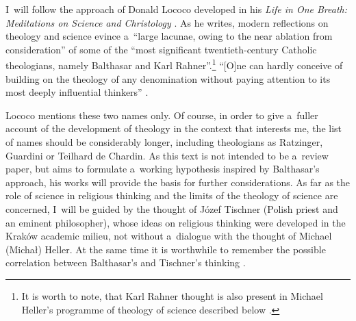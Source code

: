 I~will follow the approach of Donald Lococo developed in his \textit{Life in One Breath: Meditations on Science and Christology} 
\parencite*[][]{}. %
 As he writes, modern reflections on theology and science evince a~``large lacunae, owing to the near ablation from consideration'' of some of the ``most significant twentieth-century Catholic theologians, namely Balthasar and Karl Rahner''.\footnote{It is worth to note, that Karl Rahner thought is also present in Michael Heller's programme of theology of science described below 
\parencites[cf][pp.80–81]{macek_teologia_2014}[][p.13]{maziarka_w_2016}. %
 } ``[O]ne can hardly conceive of building on the theology of any denomination without paying attention to its most deeply influential thinkers'' 
\parencite[][p.11]{lococo_life_2021}.%




Lococo mentions these two names only. Of course, in order to give a~fuller account of the development of theology in the context that interests me, the list of names should be considerably longer, including theologians as Ratzinger, Guardini or Teilhard de Chardin. As this text is not intended to be a~review paper, but aims to formulate a~working hypothesis inspired by Balthasar's approach, his works will provide the basis for further considerations. As far as the role of science in religious thinking and the limits of the theology of science are concerned, I~will be guided by the thought of Józef Tischner (Polish priest and an eminent philosopher), whose ideas on religious thinking were developed in the Kraków academic milieu, not without a~dialogue with the thought of Michael (Michał) Heller. At the same time it is worthwhile to remember the possible correlation between Balthasar's and Tischner's thinking 
\parencite[see][]{wolowski_problem_2019}.%




